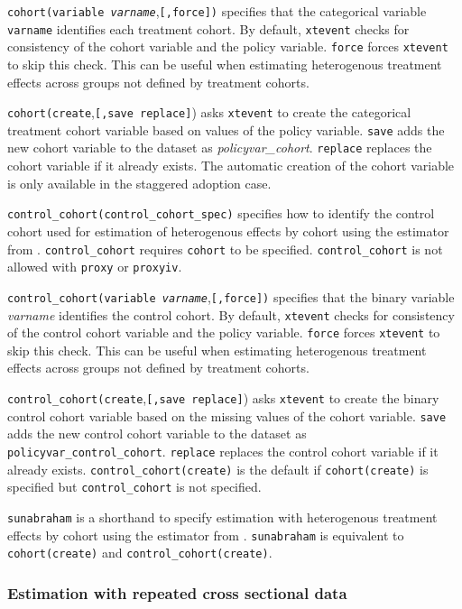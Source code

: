 \documentclass[12pt]{article}
\begin{document}
\morehangpara
{\tt cohort(variable \textit{varname}},{\tt [,force])} specifies that the categorical variable {\tt varname} identifies each treatment cohort.
By default, {\tt xtevent} checks for consistency of the cohort variable and the policy variable.
{\tt force} forces {\tt xtevent} to
skip this check.
This can be useful when estimating heterogenous treatment effects across groups not defined by treatment cohorts.

\morehangpara
{\tt cohort(create},{\tt [,save replace]}) asks {\tt xtevent} to create the categorical treatment cohort variable based on values of the policy variable.
{\tt save} adds the new cohort variable to the dataset as {\it policyvar\_cohort}.
{\tt replace} replaces the cohort variable if it already exists.
The automatic creation of the cohort variable is only available in the staggered adoption case.

\hangpara
{\tt control\_cohort(control\_cohort\_spec)} specifies how to identify the control cohort used for estimation of heterogenous effects by cohort using the estimator from \cite{sun2021estimating}.
{\tt control\_cohort} requires {\tt cohort} to be specified.
{\tt control\_cohort} is not allowed with {\tt proxy} or {\tt proxyiv}.

\morehangpara
{\tt control\_cohort(variable \textit{varname}},{\tt [,force])} specifies that the binary variable {\it varname} identifies the control cohort.
By default, {\tt xtevent} checks for consistency of the control cohort variable and the policy variable.
{\tt force} forces {\tt xtevent} to
skip this check.
This can be useful when estimating heterogenous treatment effects across groups not defined by treatment cohorts.

\morehangpara
{\tt control\_cohort(create},{\tt [,save replace]}) asks {\tt xtevent} to create the binary control cohort variable based on the missing values of
the cohort variable.
{\tt save} adds the new control cohort variable to the dataset as {\tt policyvar\_control\_cohort}.
{\tt replace} replaces the control cohort variable if it already exists.
{\tt control\_cohort(create)} is the default if {\tt cohort(create)} is specified but {\tt control\_cohort}
is not specified.

\hangpara
{\tt sunabraham} is a shorthand to specify estimation with heterogenous treatment effects by cohort using the estimator from \cite{sun2021estimating}.
{\tt sunabraham} is equivalent to {\tt cohort(create)} and {\tt control\_cohort(create)}.

\subsubsection{Estimation with repeated cross sectional data}
\end{document}
